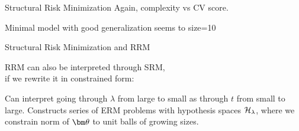 \documentclass[11pt,compress,t,notes=noshow, xcolor=table]{beamer}
\begin{document}
\begin{frame} {Structural Risk Minimization}
Again, complexity vs CV score. 


Minimal model with good generalization seems to size=10 

\end{frame}


\begin{frame} {Structural Risk Minimization and RRM}

RRM can also be interpreted through SRM, \\
if we rewrite it in constrained form:


\vfill

Can interpret going through $\lambda$ from large to small as through $t$ from small to large.
Constructs series of ERM problems with hypothesis spaces $\mathcal{H}_\lambda$, 
where we constrain norm of $\thetav$ to unit balls of growing sizes.
\end{frame}


\endlecture
\end{document}
